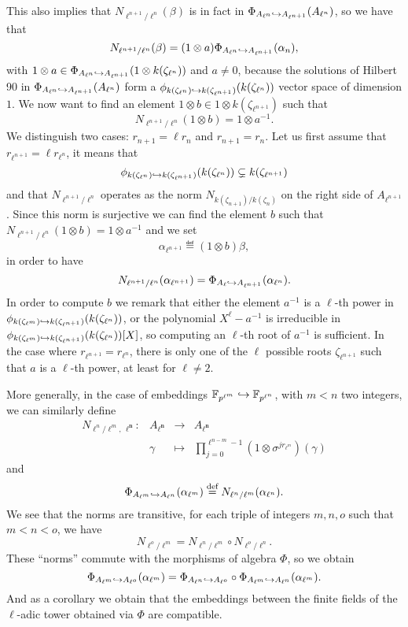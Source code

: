 \documentclass[a4paper,11pt]{article}
\begin{document}
This also implies that $N_{\ell^{n+1}/\ell^n}(\beta)$ is in fact in
$\Phi_{A_{\ell^n}\hookrightarrow A_{\ell^{n+1}}}(A_{\ell^n})$, so we have that
\[
  N_{\ell^{n+1}/\ell^n}(\beta) = (1\otimes a)\Phi_{A_{\ell^n}\hookrightarrow
  A_{\ell^{n+1}}}(\alpha_n),
\]
with $1\otimes a\in \Phi_{A_{\ell^n}\hookrightarrow A_{\ell^{n+1}}}(1\otimes
k(\zeta_{\ell^n}))$ and $a\neq0$, because the solutions of Hilbert 90 in
$\Phi_{A_{\ell^n}\hookrightarrow A_{\ell^{n+1}}}(A_{\ell^n})$
form a $\phi_{k(\zeta_{\ell^n})\hookrightarrow k(\zeta_{\ell^{n+1}})}(k(\zeta_{\ell^n}))$ vector space of dimension $1$. We now want to find an
element $1\otimes b\in1\otimes k(\zeta_{\ell^{n+1}})$ such that
\[
N_{\ell^{n+1}/\ell^n}(1\otimes b)=1\otimes a^{-1}.
\]
We distinguish two
cases: $r_{n+1}=\ell r_n$ and $r_{n+1}=r_n$.
Let us first assume that $r_{\ell^{n+1}}=\ell r_{\ell^n}$, it means that
\[
  \phi_{k(\zeta_{\ell^n})\hookrightarrow k(\zeta_{\ell^{n+1}})}(k(\zeta_{\ell^n}))\subsetneq
k(\zeta_{\ell^{n+1}})
\]
and that $N_{\ell^{n+1}/\ell^{n}}$ operates as the norm
$N_{k(\zeta_{n+1})/k(\zeta_n)}$ on the right side of $A_{\ell^{n+1}}$. Since this norm
is surjective we can find the  element $b$ such that $N_{\ell^{n+1}/\ell^n}(1\otimes b)=1\otimes a^{-1}$ and
we set 
\[
  \alpha_{\ell^{n+1}}\eqdef (1\otimes b)\beta,
\]
in order to have
\[
  N_{\ell^{n+1}/\ell^n}(\alpha_{\ell^{n+1}})=\Phi_{A_{\ell}\hookrightarrow
  A_{\ell^{n+1}}}(\alpha_{\ell^n}).
\]
In order to compute $b$ we remark that either the element
$a^{-1}$ is a $\ell$-th power in $\phi_{k(\zeta_{\ell^m})\hookrightarrow
k(\zeta_{\ell^{n+1}})}(k(\zeta_{\ell^n}))$, or the polynomial
$X^\ell-a^{-1}$ is irreducible in $\phi_{k(\zeta_{\ell^m})\hookrightarrow
k(\zeta_{\ell^{n+1}})}(k(\zeta_{\ell^n}))[X]$, so computing an $\ell$-th
root of $a^{-1}$ is sufficient. In the case where $r_{\ell^{n+1}}=r_{\ell^n}$,
there is only one of the $\ell$ possible roots $\zeta_{\ell^{n+1}}$ such that
$a$ is a $\ell$-th power, at least for $\ell\neq2$.

More generally, in the case of embeddings 
$\mathbb{F}_{p^{\ell^m}}\hookrightarrow\mathbb{F}_{p^{\ell^n}}$, with $m<n$ two integers, we can similarly define 
\[
\begin{array}{cccc}
  N_{\ell^{n}/\ell^m,\, \bm{\ell^{n}}}: & A_{\bm{\ell^{n}}} & \to &
  A_{\bm{\ell^{n}}} \\
  & \gamma & \mapsto & \prod_{j=0}^{\ell^{n-m}-1} (1 \otimes
  \sigma^{jr_{\ell^m}})(\gamma)
\end{array}
\]
and
\[
  \Phi_{A_{\ell^m}\hookrightarrow A_{\ell^n}}(\alpha_{\ell^m})\overset{\text{def}}{=}
  N_{\ell^n/\ell^m}(\alpha_{\ell^{n}}).
\]
We see that the norms are transitive, \ie for each triple of integers $m, n, o$
such that $m<n<o$,
we have
\[
  N_{\ell^o/\ell^m}=N_{\ell^{n}/\ell^{m}}\circ N_{\ell^o/\ell^n}.
\]
These ``norms'' commute with the morphisms of algebra $\Phi$, so we obtain 
\[
  \Phi_{A_{\ell^m}\hookrightarrow A_{\ell^o}}(\alpha_{\ell^m}) = \Phi_{A_{\ell^{n}}\hookrightarrow
A_{\ell^{o}}}\circ \Phi_{A_{\ell^{m}}\hookrightarrow
A_{\ell^{n}}}(\alpha_{\ell^m}).
\]
And as a corollary we obtain that the embeddings between the finite fields of
the $\ell$-adic tower obtained via $\Phi$ are compatible. 
\end{document}
